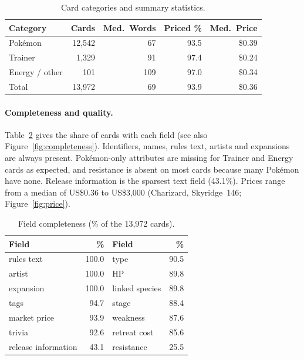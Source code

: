 \documentclass[sigconf]{acmart}
\begin{document}
  \begin{table}[ht]
      \centering
      \caption{Card categories and summary statistics.}
      \label{tab:categories}
      \small
      \setlength{\tabcolsep}{4pt}
      \begin{tabular}{lrrrr}
          \hline
          \textbf{Category} & \textbf{Cards} & \textbf{Med.\ Words} & \textbf{Priced \%} & \textbf{Med.\ Price} \\
          \hline
          Pok\'emon & 12{,}542 & 67 & 93.5 & \$0.39 \\
          Trainer & 1{,}329 & 91 & 97.4 & \$0.24 \\
          Energy / other & 101 & 109 & 97.0 & \$0.34 \\
          \hline
          Total & 13{,}972 & 69 & 93.9 & \$0.36 \\
          \hline
      \end{tabular}
  \end{table}

  \paragraph{Completeness and quality.}
  Table~\ref{tab:completeness} gives the share of cards with each field
  (see also Figure~\ref{fig:completeness}). Identifiers, names, rules text,
  artists and expansions are always present. Pok\'emon-only attributes are
  missing for Trainer and Energy cards as expected, and resistance is absent
  on most cards because many Pok\'emon have none. Release information is the
  sparsest text field (43.1\%). Prices range from a median of US\$0.36 to
  US\$3{,}000 (Charizard, Skyridge~146; Figure~\ref{fig:price}).

  \begin{table}[ht]
      \centering
      \caption{Field completeness (\% of the 13{,}972 cards).}
      \label{tab:completeness}
      \small
      \setlength{\tabcolsep}{4pt}
      \begin{tabular}{lrlr}
          \hline
          \textbf{Field} & \textbf{\%} & \textbf{Field} & \textbf{\%} \\
          \hline
          rules text & 100.0 & type & 90.5 \\
          artist & 100.0 & HP & 89.8 \\
          expansion & 100.0 & linked species & 89.8 \\
          tags & 94.7 & stage & 88.4 \\
          market price & 93.9 & weakness & 87.6 \\
          trivia & 92.6 & retreat cost & 85.6 \\
          release information & 43.1 & resistance & 25.5 \\
          \hline
      \end{tabular}
  \end{table}
\end{document}
